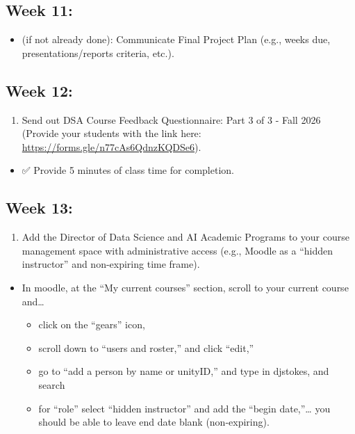 \documentclass[
  letterpaper,
  DIV=11,
  numbers=noendperiod]{scrreprt}
\providecommand{\tightlist}{%
  \setlength{\itemsep}{0pt}\setlength{\parskip}{0pt}}
\begin{document}
\subsection{Week 11:}\label{week-11}

\begin{itemize}
\tightlist
\item
  (if not already done): Communicate Final Project Plan (e.g., weeks
  due, presentations/reports criteria, etc.).
\end{itemize}

\subsection{Week 12:}\label{week-12}

\begin{enumerate}
\def\labelenumi{\arabic{enumi})}
\tightlist
\item
  Send out {DSA Course Feedback Questionnaire: Part 3 of 3 - Fall 2026}
  (Provide your students with the link here:
  \url{https://forms.gle/n77cAs6QdnzKQDSe6}).
\end{enumerate}

\begin{itemize}
\tightlist
\item
  ✅ Provide 5 minutes of class time for completion.
\end{itemize}

\subsection{Week 13:}\label{week-13}

\begin{enumerate}
\def\labelenumi{\arabic{enumi})}
\tightlist
\item
  Add the Director of Data Science and AI Academic Programs to your
  course management space with administrative access (e.g., Moodle as a
  ``hidden instructor'' and non-expiring time frame).
\end{enumerate}

\begin{itemize}
\tightlist
\item
  In moodle, at the ``My current courses'' section, scroll to your
  current course and\ldots{}

  \begin{itemize}
  \tightlist
  \item
    click on the ``gears'' icon,
  \item
    scroll down to ``users and roster,'' and click ``edit,''
  \item
    go to ``add a person by name or unityID,'' and type in djstokes, and
    search
  \item
    for ``role'' select ``hidden instructor'' and add the ``begin
    date,''\ldots{} you should be able to leave end date blank
    (non-expiring).
  \end{itemize}
\end{itemize}
\end{document}
